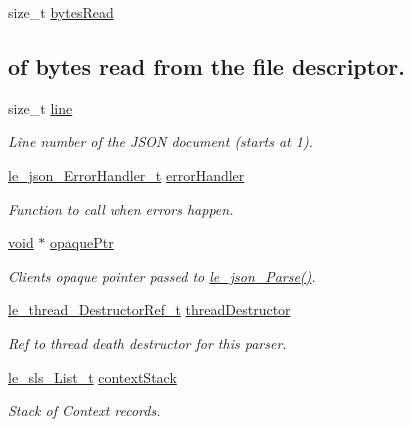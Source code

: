 \begin{DoxyCompactItemize}
size\+\_\+t \hyperlink{struct_parser__t_a1f4d91adc2810910069e6539e6145248}{bytes\+Read}
\begin{DoxyCompactList}\small\item\em \subsection*{of bytes read from the file descriptor.}\end{DoxyCompactList}\item 
size\+\_\+t \hyperlink{struct_parser__t_a6296b550b3a29a04377e32c37e18e281}{line}
\begin{DoxyCompactList}\small\item\em Line number of the J\+S\+ON document (starts at 1). \end{DoxyCompactList}\item 
\hyperlink{le__json_8h_a04bc128775367c9eff2e67861c178d2e}{le\+\_\+json\+\_\+\+Error\+Handler\+\_\+t} \hyperlink{struct_parser__t_a98153bde62ce24ba2ce458115e1f7841}{error\+Handler}
\begin{DoxyCompactList}\small\item\em Function to call when errors happen. \end{DoxyCompactList}\item 
\hyperlink{_t_e_m_p_l_a_t_e__cdef_8h_ac9c84fa68bbad002983e35ce3663c686}{void} $\ast$ \hyperlink{struct_parser__t_a7195b02bd0ace601d6e3efd202039506}{opaque\+Ptr}
\begin{DoxyCompactList}\small\item\em Client\textquotesingle{}s opaque pointer passed to \hyperlink{le__json_8h_a610f180628f8e5be75fe5a08533124df}{le\+\_\+json\+\_\+\+Parse()}. \end{DoxyCompactList}\item 
\hyperlink{le__thread_8h_a738918131ea45ff37440858db2cec7db}{le\+\_\+thread\+\_\+\+Destructor\+Ref\+\_\+t} \hyperlink{struct_parser__t_aed7e9530c05c3ed345c7b568a4696ae1}{thread\+Destructor}
\begin{DoxyCompactList}\small\item\em Ref to thread death destructor for this parser. \end{DoxyCompactList}\item 
\hyperlink{structle__sls___list__t}{le\+\_\+sls\+\_\+\+List\+\_\+t} \hyperlink{struct_parser__t_abb45dff4d21a69964649e5a108c2dde2}{context\+Stack}
\begin{DoxyCompactList}\small\item\em Stack of Context records. \end{DoxyCompactList}\end{DoxyCompactItemize}


